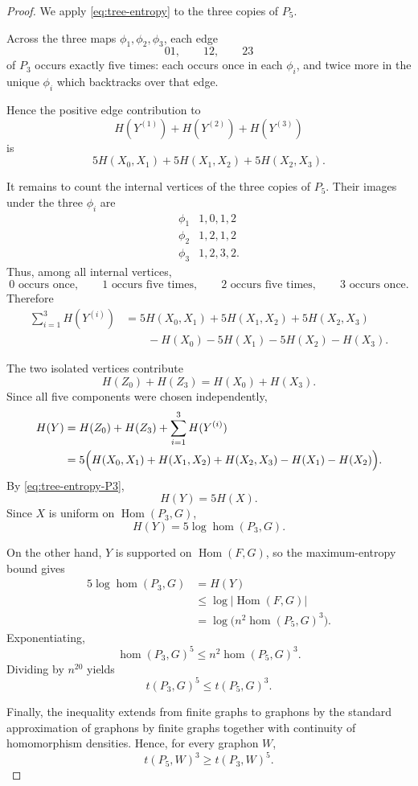 \documentclass[11pt]{article}
\DeclareMathOperator{\Hom}{Hom}
\begin{document}
\begin{proof}
We apply \eqref{eq:tree-entropy} to the three copies of $P_5$.

Across the three maps $\phi_1,\phi_2,\phi_3$, each edge
\[
    01,\qquad 12,\qquad 23
\]
of $P_3$ occurs exactly five times:
each occurs once in each $\phi_i$, and twice more in the unique
$\phi_i$ which backtracks over that edge.

Hence the positive edge contribution to
\[
    H(Y^{(1)})+H(Y^{(2)})+H(Y^{(3)})
\]
is
\[
    5H(X_0,X_1)
    +5H(X_1,X_2)
    +5H(X_2,X_3).
\]

It remains to count the internal vertices of the three copies of
$P_5$.  Their images under the three $\phi_i$ are
\[
\begin{array}{c|c}
\phi_1 & 1,0,1,2\\
\phi_2 & 1,2,1,2\\
\phi_3 & 1,2,3,2.
\end{array}
\]
Thus, among all internal vertices,
\[
    0\text{ occurs once},\qquad
    1\text{ occurs five times},\qquad
    2\text{ occurs five times},\qquad
    3\text{ occurs once}.
\]
Therefore
\begin{align*}
\sum_{i=1}^3 H(Y^{(i)})
&=
5H(X_0,X_1)+5H(X_1,X_2)+5H(X_2,X_3)\\
&\qquad
-H(X_0)-5H(X_1)-5H(X_2)-H(X_3).
\end{align*}

The two isolated vertices contribute
\[
    H(Z_0)+H(Z_3)=H(X_0)+H(X_3).
\]
Since all five components were chosen independently,
\[
\begin{aligned}
H(Y)
&=
H(Z_0)+H(Z_3)+\sum_{i=1}^3H(Y^{(i)})\\
&=
5\Bigl(
H(X_0,X_1)+H(X_1,X_2)+H(X_2,X_3)
-H(X_1)-H(X_2)
\Bigr).
\end{aligned}
\]
By \eqref{eq:tree-entropy-P3},
\[
    H(Y)=5H(X).
\]
Since $X$ is uniform on $\Hom(P_3,G)$,
\[
    H(Y)
    =
    5\log\hom(P_3,G).
\]

On the other hand, $Y$ is supported on $\Hom(F,G)$, so the
maximum-entropy bound gives
\[
\begin{aligned}
    5\log\hom(P_3,G)
    &=H(Y)\\
    &\le \log|\Hom(F,G)|\\
    &=\log\bigl(n^2\hom(P_5,G)^3\bigr).
\end{aligned}
\]
Exponentiating,
\[
    \hom(P_3,G)^5
    \le
    n^2\hom(P_5,G)^3.
\]
Dividing by $n^{20}$ yields
\[
    t(P_3,G)^5
    \le
    t(P_5,G)^3.
\]

Finally, the inequality extends from finite graphs to graphons by the
standard approximation of graphons by finite graphs together with
continuity of homomorphism densities.  Hence, for every graphon $W$,
\[
    \boxed{t(P_5,W)^3\ge t(P_3,W)^5}.
\]
\end{proof}
\end{document}
